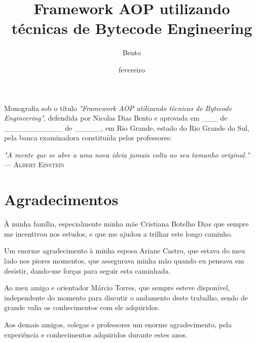 \documentclass[tc,oneside]{iiufrgs}
\title{Framework AOP utilizando técnicas de Bytecode Engineering}
\author{Bento}{Nicolas Dias}
\date{fevereiro}{2014}
\begin{document}
\maketitle

\begin{folhadeaprovacao}
Monografia sob o título \textit{"Framework AOP utilizando técnicas de Bytecode Engineering"}, defendida por Nicolas Dias Bento e aprovada em \_\_\_ de \_\_\_\_\_\_\_\_\_\_\_ de \_\_\_\_\_, em Rio Grande, estado do Rio Grande do Sul, pela banca examinadora constituída pelos professores:
\end{folhadeaprovacao}

\clearpage

\begin{flushright}
\mbox{}\vfill
{\sffamily\itshape
"A mente que se abre a uma nova ideia jamais volta ao seu tamanho original."\\}
--- \textsc{Albert Einstein}
\end{flushright}

\chapter*{Agradecimentos}

À minha família, especialmente minha mãe Cristiana Botelho Dias que sempre me incentivou nos estudos, e que me ajudou a trilhar este longo caminho.

Um enorme agradecimento à minha esposa Ariane Castro, que estava do meu lado nos piores momentos, que assegurava minha mão quando eu pensava em desistir, dando-me forças para seguir esta caminhada.

Ao meu amigo e orientador Márcio Torres, que sempre esteve disponível, independente do momento para discutir o andamento deste trabalho, sendo de grande valia os conhecimentos com ele adquiridos.

Aos demais amigos, colegas e professores um enorme agradecimento, pela experiência e conhecimentos adquiridos durante estes anos.
\tableofcontents
\end{document}
